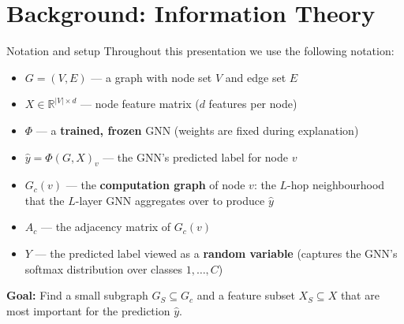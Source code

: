 \documentclass[xcolor=svgnames,aspectratio=169]{beamer}
\begin{document}
\section{Background: Information Theory}

\begin{frame}{Notation and setup}
    Throughout this presentation we use the following notation:
    \begin{itemize}
        \item $G = (V, E)$ --- a graph with node set $V$ and edge set $E$
        \item $X \in \mathbb{R}^{|V| \times d}$ --- node feature matrix ($d$ features per node)
        \item $\Phi$ --- a \textbf{trained, frozen} GNN (weights are fixed during explanation)
        \item $\hat{y} = \Phi(G, X)_v$ --- the GNN's predicted label for node $v$
        \item $G_c(v)$ --- the \textbf{computation graph} of node $v$: the $L$-hop neighbourhood that the $L$-layer GNN aggregates over to produce $\hat{y}$
        \item $A_c$ --- the adjacency matrix of $G_c(v)$
        \item $Y$ --- the predicted label viewed as a \textbf{random variable} (captures the GNN's softmax distribution over classes $1, \dots, C$)
    \end{itemize}
    \vspace{4pt}
    \textbf{Goal:} Find a small subgraph $G_S \subseteq G_c$ and a feature subset $X_S \subseteq X$ that are most important for the prediction $\hat{y}$.
\end{frame}
\end{document}
